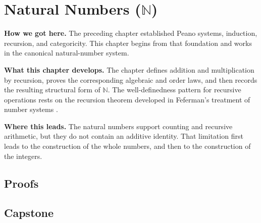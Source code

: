 \chapter{Natural Numbers ($\mathbb{N}$)}
\label{ch:natural-numbers}


\begin{tcolorbox}[
  colback=gray!6,
  colframe=gray!40,
  arc=2pt,
  left=8pt, right=8pt, top=6pt, bottom=6pt,
  title={\small\textbf{Structural Roadmap}},
  fonttitle=\small\bfseries
]
\noindent\textbf{How we got here.}
The preceding chapter established Peano systems, induction, recursion, and
categoricity. This chapter begins from that foundation and works in the
canonical natural-number system.

\medskip
\noindent\textbf{What this chapter develops.}
The chapter defines addition and multiplication by recursion, proves the
corresponding algebraic and order laws, and then records the resulting
structural form of $\mathbb{N}$. The well-definedness pattern for recursive
operations rests on the recursion theorem developed in Feferman's treatment of
number systems \citep{FefermanNumberSystems1964}.

\medskip
\noindent\textbf{Where this leads.}
The natural numbers support counting and recursive arithmetic, but they do not
contain an additive identity. That limitation first leads to the construction
of the whole numbers, and then to the construction of the integers.
\end{tcolorbox}



\section*{Proofs}

\section*{Capstone}
